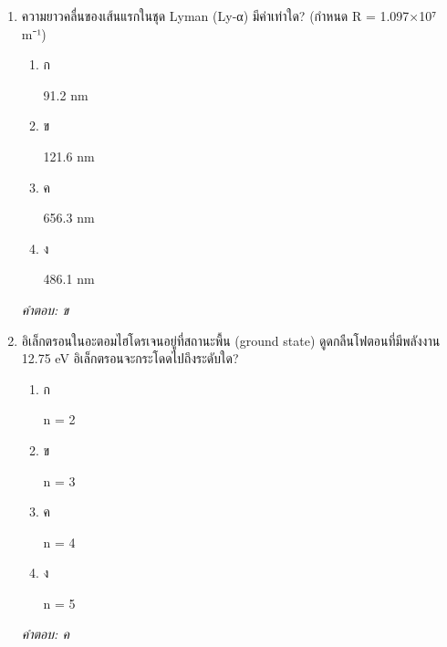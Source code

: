 \documentclass[12pt]{article}
\begin{document}
\begin{enumerate}[label=\arabic*., itemsep=0.5\baselineskip, topsep=0.5\baselineskip, leftmargin=*]
\item ความยาวคลื่นของเส้นแรกในชุด Lyman (Ly-α) มีค่าเท่าใด? (กำหนด R = 1.097×10⁷ m⁻¹)
\begin{enumerate}[label=\alph*)., itemsep=0.3\baselineskip, topsep=0.3\baselineskip]
\item ก\ 
\begin{minipage}[t]{0.9\linewidth}
\raggedright 91.2 nm
\end{minipage}
\item ข\ 
\begin{minipage}[t]{0.9\linewidth}
\raggedright 121.6 nm
\end{minipage}
\item ค\ 
\begin{minipage}[t]{0.9\linewidth}
\raggedright 656.3 nm
\end{minipage}
\item ง\ 
\begin{minipage}[t]{0.9\linewidth}
\raggedright 486.1 nm
\end{minipage}
\end{enumerate}
\vspace{-0.3\baselineskip}
\begin{small}
\textit{คำตอบ: ข}
\end{small}

\item อิเล็กตรอนในอะตอมไฮโดรเจนอยู่ที่สถานะพื้น (ground state) ดูดกลืนโฟตอนที่มีพลังงาน 12.75 eV อิเล็กตรอนจะกระโดดไปถึงระดับใด?
\begin{enumerate}[label=\alph*)., itemsep=0.3\baselineskip, topsep=0.3\baselineskip]
\item ก\ 
\begin{minipage}[t]{0.9\linewidth}
\raggedright n = 2
\end{minipage}
\item ข\ 
\begin{minipage}[t]{0.9\linewidth}
\raggedright n = 3
\end{minipage}
\item ค\ 
\begin{minipage}[t]{0.9\linewidth}
\raggedright n = 4
\end{minipage}
\item ง\ 
\begin{minipage}[t]{0.9\linewidth}
\raggedright n = 5
\end{minipage}
\end{enumerate}
\vspace{-0.3\baselineskip}
\begin{small}
\textit{คำตอบ: ค}
\end{small}


\end{enumerate}
\end{document}
